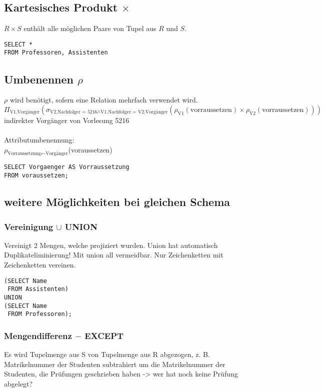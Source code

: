 \subsection{Kartesisches Produkt $\times$}
$R\times S$ enthält alle möglichen Paare von Tupel aus $R$ und $S$.
\begin{lstlisting}
SELECT * 
FROM Professoren, Assistenten
\end{lstlisting}
\subsection{Umbenennen $\rho$}
$\rho$ wird benötigt, sofern eine Relation mehrfach verwendet wird. \qquad\\
$\Pi_{\text{V1.Vorgänger}}(\sigma_{\text{V2.Nachfolger = 5216}\wedge\text{V1.Nachfolger = V2.Vorgänger}}(\rho_{\text{V1}}(\text{vorraussetzen})\times\rho_{\text{V2}}(\text{vorraussetzen})))$ \\
indirekter Vorgänger von Vorlesung 5216\\
\qquad\\
Attributumbenennung:\\
$\rho_{\text{Vorraussetzung} \leftarrow \text{Vorgänger}}$(voraussetzen)
\begin{lstlisting}
SELECT Vorgaenger AS Vorraussetzung
FROM voraussetzen;
\end{lstlisting}
\subsection{weitere Möglichkeiten bei gleichen Schema}
\subsubsection{Vereinigung $\cup$ UNION}
Vereinigt 2 Mengen, welche projiziert wurden. 
Union hat automatisch Duplikateliminierung! Mit union all vermeidbar. Nur Zeichenketten mit Zeichenketten vereinen.
\begin{lstlisting}
(SELECT Name			
 FROM Assistenten)			
UNION
(SELECT Name			
 FROM Professoren);
\end{lstlisting}
\subsubsection{Mengendifferenz $-$ EXCEPT}
Es wird Tupelmenge aus S von Tupelmenge aus R abgezogen, z. B. Matrikelnummer der Studenten subtrahiert um die Matrikelnummer der Studenten, die Prüfungen geschrieben haben -> wer hat noch keine Prüfung abgelegt?

